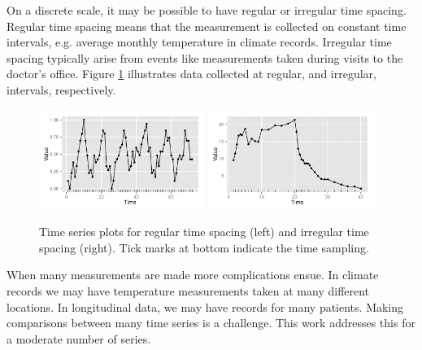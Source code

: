 \documentclass[12pt]{article}
\begin{document}
On a discrete scale, it may be possible to have regular or irregular time spacing. Regular time spacing means that the measurement is collected on constant time intervals, e.g. average monthly temperature in climate records. Irregular time spacing typically arise from events like measurements taken during visits to the doctor's office. Figure \ref{fig:Time-series-plots} illustrates data collected at regular, and irregular, intervals, respectively.

\begin{figure}[h]
\begin{centering}
\includegraphics[width=0.48\textwidth]{graph/pipeline-01-regular} \includegraphics[width=0.48\textwidth]{graph/pipeline-01-irregular}
\par\end{centering}

\caption{\label{fig:Time-series-plots}Time series plots for regular time spacing
 (left) and irregular time spacing  (right). Tick marks at bottom indicate the time sampling.}
\end{figure}

When many measurements are made more complications ensue. In climate records we may have temperature measurements taken at many different locations. In longitudinal data, we may have records for many patients. Making comparisons between many time series is a challenge. This work addresses this for a moderate number of series.

\end{document}
